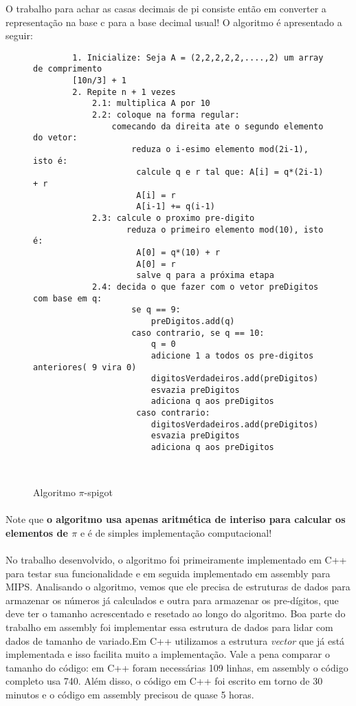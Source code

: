 O trabalho para achar as casas decimais de pi consiste então em converter a
representação na base c para a base decimal usual! O algoritmo é apresentado a
seguir:

\begin{figure}[H]
    \begin{BVerbatim}
        1. Inicialize: Seja A = (2,2,2,2,2,....,2) um array de comprimento
        [10n/3] + 1
        2. Repite n + 1 vezes
            2.1: multiplica A por 10
            2.2: coloque na forma regular:
                comecando da direita ate o segundo elemento do vetor:
                    reduza o i-esimo elemento mod(2i-1), isto é:
                     calcule q e r tal que: A[i] = q*(2i-1) + r
                     A[i] = r
                     A[i-1] += q(i-1)
            2.3: calcule o proximo pre-digito
                   reduza o primeiro elemento mod(10), isto é:
                     A[0] = q*(10) + r
                     A[0] = r
                     salve q para a próxima etapa
            2.4: decida o que fazer com o vetor preDigitos com base em q:
                    se q == 9:
                        preDigitos.add(q)
                    caso contrario, se q == 10:
                        q = 0
                        adicione 1 a todos os pre-digitos anteriores( 9 vira 0)
                        digitosVerdadeiros.add(preDigitos)
                        esvazia preDigitos
                        adiciona q aos preDigitos
                     caso contrario:
                        digitosVerdadeiros.add(preDigitos)
                        esvazia preDigitos
                        adiciona q aos preDigitos
                        
                        
    \end{BVerbatim}
\caption{Algoritmo $\pi$-spigot}
\end{figure}

\paragraph{} Note que \textbf{o algoritmo usa apenas aritmética de interiso para
calcular os elementos de $\pi$} e é de simples implementação computacional!

\paragraph{} No trabalho desenvolvido, o algoritmo foi primeiramente
implementado em C++ para testar sua funcionalidade e em seguida implementado em
assembly para MIPS. Analisando o algoritmo, vemos que ele precisa de estruturas
de dados para armazenar os números já calculados e outra para armazenar os pre-dígitos, que deve ter o tamanho acrescentado
e resetado ao longo do algoritmo. Boa parte do trabalho em
assembly foi implementar essa estrutura de dados para lidar com dados de tamanho de variado.Em C++ utilizamos a estrutura
\emph{vector} que já está implementada e isso facilita muito a implementação.  Vale a pena comparar o
tamanho do código: em C++ foram necessárias 109 linhas, em assembly o código
completo usa 740. Além disso, o código em C++ foi escrito em torno de 30
minutos e o código em assembly precisou de quase 5 horas.

